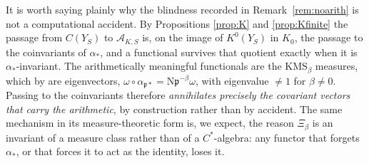 \documentclass[11pt]{amsart}
\numberwithin{equation}{section}
\theoremstyle{definition}
\theoremstyle{remark}
\newcommand{\cA}{\mathcal{A}}
\newcommand{\pp}{\mathfrak{p}}
\newcommand{\Ns}{\mathrm{N}}
\begin{document}
It is worth saying plainly why the blindness recorded in Remark~\ref{rem:noarith} is not a
computational accident. By Propositions \ref{prop:K} and \ref{prop:Kfinite} the passage
from $C(Y_S)$ to $\cA_{K,S}$ is, on the image of $K^0(Y_S)$ in $K_0$, the passage to the
coinvariants of $\alpha_*$, and a functional survives that quotient exactly when it is
$\alpha_*$-invariant. The arithmetically
meaningful functionals are the $\mathrm{KMS}_\beta$ measures, which by
\cite[Prop.~2.8]{Main} are eigenvectors,
$\omega\circ\alpha_{\pp*}=\Ns\pp^{-\beta}\omega$, with eigenvalue $\ne1$ for $\beta\ne0$.
Passing to the coinvariants therefore \emph{annihilates precisely the covariant vectors that
carry the arithmetic}, by construction rather than by accident. The same mechanism in its
measure-theoretic form is, we expect, the reason $\Xi_\beta$ is an
invariant of a measure class rather than of a $C^*$-algebra: any functor that forgets
$\alpha_*$, or that forces it to act as the identity, loses it.
\end{document}
